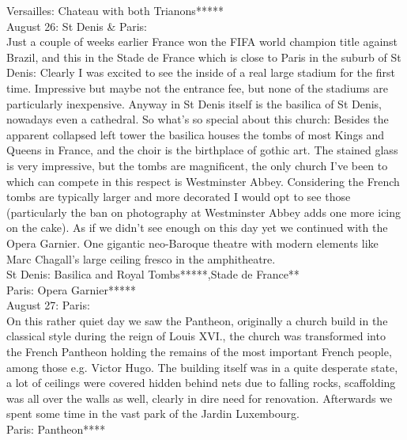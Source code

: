 Versailles: Chateau with both Trianons*****\\

August 26: St Denis \& Paris:\\
Just a couple of weeks earlier France won the FIFA world champion title against Brazil, and this in the Stade de France which is close to Paris in the suburb of St Denis: Clearly I was excited to see the inside of a real large stadium for the first time. Impressive but maybe not the entrance fee, but none of the stadiums are particularly inexpensive. Anyway in St Denis itself is the basilica of St Denis, nowadays even a cathedral. So what's so special about this church: Besides the apparent collapsed left tower the basilica houses the tombs of most Kings and Queens in France, and the choir is the birthplace of gothic art. The stained glass is very impressive, but the tombs are magnificent, the only church I've been to which can compete in this respect is Westminster Abbey. Considering the French tombs are typically larger and more decorated I would opt to see those (particularly the ban on photography at Westminster Abbey adds one more icing on the cake). As if we didn't see enough on this day yet we continued with the Opera Garnier. One gigantic neo-Baroque theatre with modern elements like Marc Chagall's large ceiling fresco in the amphitheatre.\\

St Denis: Basilica and Royal Tombs*****,Stade de France**\\
Paris: Opera Garnier*****\\

August 27: Paris:\\
On this rather quiet day we saw the Pantheon, originally a church build in the classical style during the reign of Louis XVI., the church was transformed into the French Pantheon holding the remains of the most important French people, among those e.g. Victor Hugo. The building itself was in a quite desperate state, a lot of ceilings were covered hidden behind nets due to falling rocks, scaffolding was all over the walls as well, clearly in dire need for renovation. Afterwards we spent some time in the vast park of the Jardin Luxembourg.\\

Paris: Pantheon****\\

